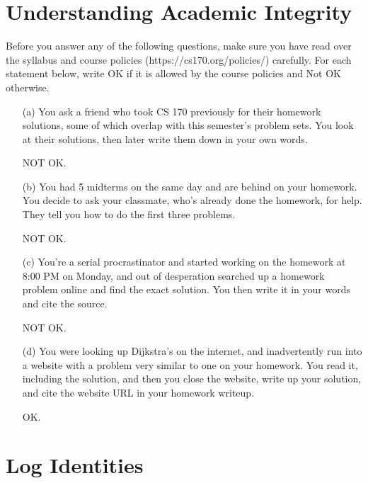 \documentclass{article}
\begin{document}
\newpage

\section*{Understanding Academic Integrity}
Before you answer any of the following questions, make sure you have read over the syllabus and course policies (https://cs170.org/policies/) carefully. For each statement below, write OK if it is allowed by the course policies and Not OK otherwise.
    \begin{itemize}
        \item [(a)] You ask a friend who took CS 170 previously for their homework solutions, some of which overlap with this semester’s problem sets. You look at their solutions, then later write them down in your own words.
            \begin{answer}
                NOT OK.
            \end{answer}

        \item [(b)] You had 5 midterms on the same day and are behind on your homework. You decide to ask your classmate, who’s already done the homework, for help. They tell you how to do the first three problems.
            \begin{answer}
                NOT OK.
            \end{answer}

        \item [(c)] You’re a serial procrastinator and started working on the homework at 8:00 PM on Monday, and out of desperation searched up a homework problem online and find the exact solution. You then write it in your words and cite the source.
            \begin{answer}
                NOT OK.
            \end{answer}


        \item [(d)] You were looking up Dijkstra’s on the internet, and inadvertently run into a website with a problem very similar to one on your homework. You read it, including the solution, and then you close the website, write up your solution, and cite the website URL in your homework writeup. 
            \begin{answer}
                OK.
            \end{answer}
    \end{itemize}

\newpage
\section*{Log Identities}
\end{document}

